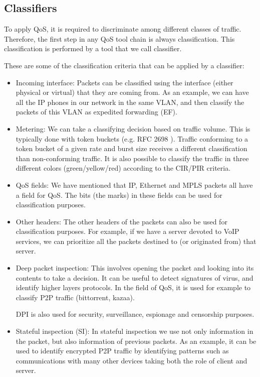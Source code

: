 \subsection{Classifiers}

To apply QoS, it is required to discriminate among different classes of traffic.
Therefore, the first step in any QoS tool chain is always classification.
This classification is performed by a tool that we call classifier.

These are some of the classification criteria that can be applied by a classifier:
\begin{itemize}
\item Incoming interface: Packets can be classified using the interface (either physical or virtual) that they are coming from.
As an example, we can have all the IP phones in our network in the same VLAN, and then classify the packets of this VLAN as expedited forwarding (EF).

\item Metering: We can take a classifying decision based on traffic volume.
This is typically done with token buckets (e.g. RFC 2698 \cite{rfc2698}).
Traffic conforming to a token bucket of a given rate and burst size receives a different classification than non-conforming traffic.
It is also possible to classify the traffic in three different colors (green/yellow/red) according to the CIR/PIR criteria.

\item QoS fields: We have mentioned that IP, Ethernet and MPLS packets all have a field for QoS.
The bits (the marks) in these fields can be used for classification purposes.

\item Other headers: The other headers of the packets can also be used for classification purposes.
For example, if we have a server devoted to VoIP services, we can prioritize all the packets destined to (or originated from) that server.

\item Deep packet inspection: This involves opening the packet and looking into its contents to take a decision.
It can be useful to detect signatures of virus, and identify higher layers protocols.
In the field of QoS, it is used for example to classify P2P traffic (bittorrent, kazaa).

DPI is also used for security, surveillance, espionage and censorship purposes.

\item Stateful inspection (SI): In stateful inspection we use not only information in the packet, but also information of previous packets.
As an example, it can be used to identify encrypted P2P traffic by identifying patterns such as communications with many other devices taking both the role of client and server.
\end{itemize}

